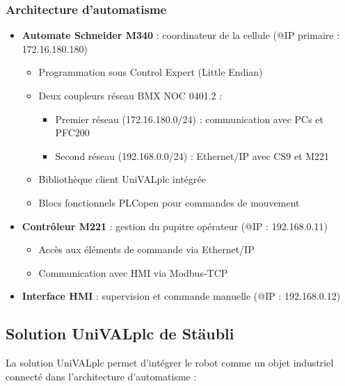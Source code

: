 \subsubsection{Architecture d'automatisme}
\begin{itemize}
    \item \textbf{Automate Schneider M340} : coordinateur de la cellule (@IP primaire : 172.16.180.180)
    \begin{itemize}
        \item Programmation sous Control Expert (Little Endian)
        \item Deux coupleurs réseau BMX NOC 0401.2 :
        \begin{itemize}
            \item Premier réseau (172.16.180.0/24) : communication avec PCs et PFC200
            \item Second réseau (192.168.0.0/24) : Ethernet/IP avec CS9 et M221
        \end{itemize}
        \item Bibliothèque client UniVALplc intégrée
        \item Blocs fonctionnels PLCopen pour commandes de mouvement
    \end{itemize}
    \item \textbf{Contrôleur M221} : gestion du pupitre opérateur (@IP : 192.168.0.11)
    \begin{itemize}
        \item Accès aux éléments de commande via Ethernet/IP
        \item Communication avec HMI via Modbus-TCP
    \end{itemize}
    \item \textbf{Interface HMI} : supervision et commande manuelle (@IP : 192.168.0.12)
\end{itemize}



\subsection{Solution UniVALplc de Stäubli}

La solution UniVALplc permet d'intégrer le robot comme un objet industriel connecté dans l'architecture d'automatisme :

